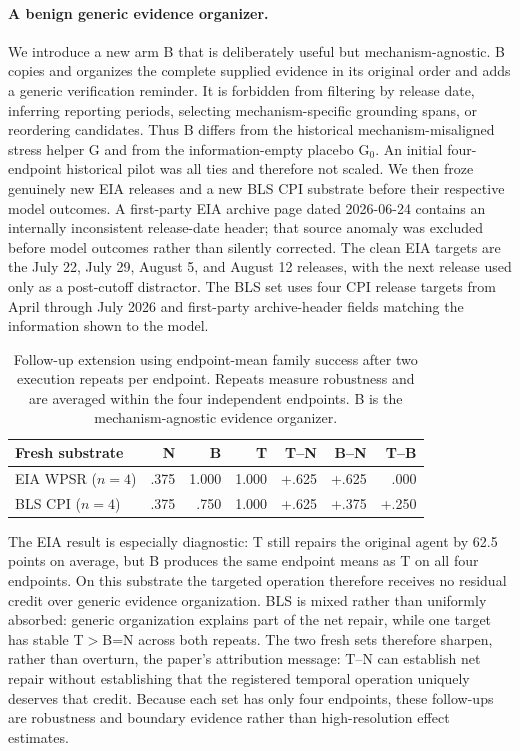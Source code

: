 \paragraph{A benign generic evidence organizer.}
We introduce a new arm B that is deliberately useful but mechanism-agnostic. B copies and organizes the complete supplied evidence in its original order and adds a generic verification reminder. It is forbidden from filtering by release date, inferring reporting periods, selecting mechanism-specific grounding spans, or reordering candidates. Thus B differs from the historical mechanism-misaligned stress helper G and from the information-empty placebo G$_0$. An initial four-endpoint historical pilot was all ties and therefore not scaled. We then froze genuinely new EIA releases and a new BLS CPI substrate before their respective model outcomes. A first-party EIA archive page dated 2026-06-24 contains an internally inconsistent release-date header; that source anomaly was excluded before model outcomes rather than silently corrected. The clean EIA targets are the July 22, July 29, August 5, and August 12 releases, with the next release used only as a post-cutoff distractor. The BLS set uses four CPI release targets from April through July 2026 and first-party archive-header fields matching the information shown to the model.

\begin{table}[ht]
\centering
\scriptsize
\setlength{\tabcolsep}{4pt}
\begin{tabular}{lrrrrrr}
\toprule
Fresh substrate & N & B & T & T--N & B--N & T--B \\
\midrule
EIA WPSR ($n=4$) & .375 & 1.000 & 1.000 & +.625 & +.625 & .000 \\
BLS CPI ($n=4$) & .375 & .750 & 1.000 & +.625 & +.375 & +.250 \\
\bottomrule
\end{tabular}
\caption{Follow-up extension using endpoint-mean family success after two execution repeats per endpoint. Repeats measure robustness and are averaged within the four independent endpoints. B is the mechanism-agnostic evidence organizer.}
\label{tab:benign-extension}
\end{table}

The EIA result is especially diagnostic: T still repairs the original agent by 62.5 points on average, but B produces the same endpoint means as T on all four endpoints. On this substrate the targeted operation therefore receives no residual credit over generic evidence organization. BLS is mixed rather than uniformly absorbed: generic organization explains part of the net repair, while one target has stable T$>$B=N across both repeats. The two fresh sets therefore sharpen, rather than overturn, the paper's attribution message: T--N can establish net repair without establishing that the registered temporal operation uniquely deserves that credit. Because each set has only four endpoints, these follow-ups are robustness and boundary evidence rather than high-resolution effect estimates.

